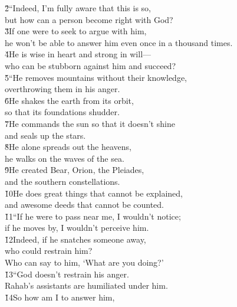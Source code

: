 \begin{poetry}
\poeml \v{2}``Indeed, I'm fully aware that this is so, \\
\poemll    but how can a person become right with God? \\
\poeml \v{3}If one were to seek to argue with him, \\
\poemll    he won't be able to answer him even once in a thousand times. \\
\poeml \v{4}He is wise in heart and strong in will--- \\
\poemll    who can be stubborn against him and succeed? \\
\poeml \v{5}``He removes mountains without their knowledge, \\
\poemll    overthrowing them in his anger. \\
\poeml \v{6}He shakes the earth from its orbit, \\
\poemll    so that its foundations shudder. \\
\poeml \v{7}He commands the sun so that it doesn't shine \\
\poemll    and seals up the stars. \\
\poeml \v{8}He alone spreads out the heavens, \\
\poemll    he walks on the waves of the sea. \\
\poeml \v{9}He created Bear, Orion, the Pleiades, \\
\poemll    and the southern constellations. \\
\poeml \v{10}He does great things that cannot be explained, \\
\poemll    and awesome deeds that cannot be counted. \\
\poeml \v{11}``If he were to pass near me, I wouldn't notice; \\
\poemll    if he moves by, I wouldn't perceive him. \\
\poeml \v{12}Indeed, if he snatches someone away, \\
\poemll    who could restrain him? \\
\poemlll       Who can say to him, `What are you doing?' \\
\poeml \v{13}``God doesn't restrain his anger. \\
\poemll    Rahab's assistants are humiliated under him. \\
\poeml \v{14}So how am I to answer him, \\

\end{poetry}
